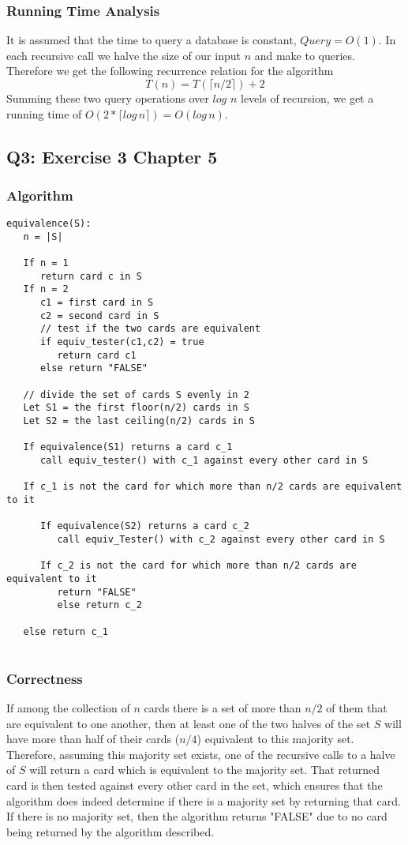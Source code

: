 \documentclass[12pt, oneside]{article}
\begin{document}
\subsubsection*{Running Time Analysis}
It is assumed that the time to query a database is constant, $Query = O(1)$. In each recursive call we halve the size of our input $n$ and make to queries. Therefore we get the following recurrence relation for the algorithm
\[T(n) = T(\lceil n/2 \rceil ) + 2\]
Summing these two query operations over $log$ $n$ levels of recursion, we get a running time of $O(2* \lceil log \,n \rceil ) = O(log\,n)$.


\subsection*{Q3: Exercise 3 Chapter 5}
\subsubsection*{Algorithm}
\begin{verbatim}
equivalence(S):
   n = |S|
   
   If n = 1
      return card c in S
   If n = 2
      c1 = first card in S
      c2 = second card in S
      // test if the two cards are equivalent
      if equiv_tester(c1,c2) = true
         return card c1
      else return "FALSE"
   
   // divide the set of cards S evenly in 2
   Let S1 = the first floor(n/2) cards in S
   Let S2 = the last ceiling(n/2) cards in S
   
   If equivalence(S1) returns a card c_1
      call equiv_tester() with c_1 against every other card in S
   
   If c_1 is not the card for which more than n/2 cards are equivalent to it
      
      If equivalence(S2) returns a card c_2
         call equiv_Tester() with c_2 against every other card in S
      
      If c_2 is not the card for which more than n/2 cards are equivalent to it
         return "FALSE" 
         else return c_2
      
   else return c_1
   
\end{verbatim}

\subsubsection*{Correctness}
If among the collection of $n$ cards there is a set of more than $n/2$ of them that are equivalent to one another, then at least one of the two halves of the set $S$ will have more than half of their cards ($n/4$) equivalent to this majority set. Therefore, assuming this majority set exists, one of the recursive calls to a halve of $S$ will return a card which is equivalent to the majority set. That returned card is then tested against every other card in the set, which ensures that the algorithm does indeed determine if there is a majority set by returning that card. If there is no majority set, then the algorithm returns "FALSE" due to no card being returned by the algorithm described.
\end{document}
